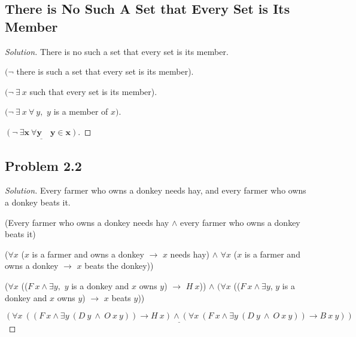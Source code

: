 \documentclass{article}
\newenvironment{solution}{\begin{proof}[\noindent\it Solution]}{\end{proof}}
\begin{document}
\subsection{There is No Such A Set that Every Set is Its Member}
\vspace{1em}
\begin{solution}
    There is no such a set that every set is its member.

    \hspace{2.6em}
    $(\neg$ there is such a set that every set is its member).
    
    \hspace{2.6em}
    $(\neg\ \exists\ x$ such that every set is its member).

    \hspace{2.6em}
    $(\neg\ \exists\ x\ \forall\ y,$ $y$ is a member of $x)$.

    \hspace{2.6em}
    $\underline{\boldsymbol{(\neg\ \exists x\ \forall y\quad y\in x)}}.$
\end{solution}

\vspace{0.5em}
\subsection{Problem 2.2}
\vspace{1em}
\begin{solution}
    Every farmer who owns a donkey needs hay, and every farmer who owns a donkey beats it.

    \hspace{2.6em}
    (Every farmer who owns a donkey needs hay $\land$ every farmer who owns a donkey beats it)

    \hspace{2.6em}
    ($\forall x$ ($x$ is a farmer and owns a donkey $\rightarrow$ $x$ needs hay) $\land$ $\forall x$ ($x$ is a farmer and owns a donkey $\rightarrow$ $x$ beats the donkey))

    \hspace{2.6em}
    ($\forall x$ (($F\ x\land \exists y, $ $y$ is a donkey and $x$ owns $y$) $\rightarrow$ $H\ x$)) $\land$ $(\forall x$ (($F\ x\land\exists y$, $y$ is a donkey and $x$ owns $y$) $\rightarrow$ $x$ beats $y$))

    \hspace{2.6em}
    $\underline{(\forall x\ ((F\ x\land\exists y\ (D\ y\ \land\ O\ x\ y)) \rightarrow H\ x) \land (\forall x\ (F\ x\land\exists y\ (D\ y\ \land\ O\ x\ y))\rightarrow B\ x\ y))}$
\end{solution}
\end{document}
